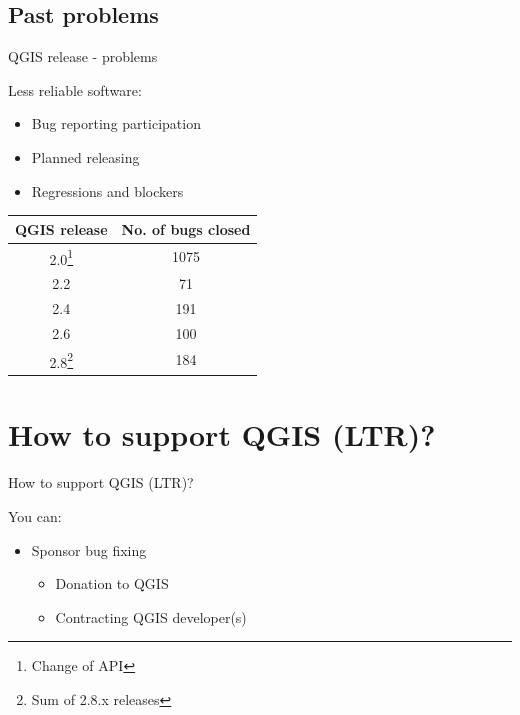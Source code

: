 \subsection{Past problems}
\begin{frame}{QGIS release - problems}
	\begin{block}{Less reliable software:}
		\begin{itemize}
			\item Bug reporting participation
			\item Planned releasing 
			\item Regressions and blockers
		\end{itemize}
	\end{block}
	\begin{center}
		
		\begin{tabular}{|c|c|}
			\hline QGIS release & No. of bugs closed \\ 
			\hline 2.0\footnote{Change of API} & 1075 \\ 
			\hline 2.2 & 71 \\ 
			\hline 2.4 & 191 \\ 
			\hline 2.6 & 100 \\ 
			\hline 2.8\footnote{Sum of 2.8.x releases} & 184 \\ 
			\hline 
		\end{tabular}
	\end{center} 
\end{frame}


\section{How to support QGIS (LTR)?}

\begin{frame}{How to support QGIS (LTR)?}
	\begin{block}{You can:}
		\begin{itemize}
			\item Sponsor bug fixing
				\begin{itemize}
					\item Donation to QGIS
					\item Contracting QGIS developer(s)
				\end{itemize}
		\end{itemize}
	\end{block}
\end{frame}

